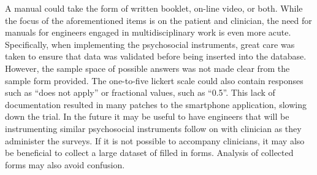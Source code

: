 A manual could take the form of written booklet, on-line video, or both. 
While the focus of the aforementioned items is on the patient and clinician, the need for manuals for engineers engaged in multidisciplinary work is even more acute. Specifically, when implementing the psychosocial instruments, great care was taken to ensure that data was validated before being inserted into the database. However, the sample space of possible answers was not made clear from the sample form provided. The one-to-five lickert scale could also contain responses such as ``does not apply'' or fractional values, such as ``0.5''. This lack of documentation resulted in many patches to the smartphone application, slowing down the trial. In the future it may be useful to have engineers that will be instrumenting similar psychosocial instruments follow on with clinician as they administer the surveys. If it is not possible to accompany clinicians, it may also be beneficial to collect a large dataset of filled in forms. Analysis of collected forms may also avoid confusion.




